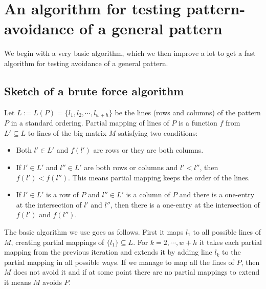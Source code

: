 \chapter{An algorithm for testing pattern-avoidance of a general pattern}
We begin with a very basic algorithm, which we then improve a lot to get a fast algorithm for testing avoidance of a general pattern.

\section{Sketch of a brute force algorithm}
Let $L:=L(P)=\{l_1,l_2,\cdots,l_{w+h}\}$ be the lines (rows and columns) of the pattern $P$ in a standard ordering. Partial mapping of lines of $P$ is a function $f$ from $L'\subseteq L$ to lines of the big matrix $M$ satisfying two conditions: 
\begin{itemize}
\item Both $l'\in L'$ and $f(l')$ are rows or they are both columns.
\item If $l'\in L'$ and $l''\in L'$ are both rows or columns and $l'<l''$, then $f(l')<f(l'')$. This means partial mapping keeps the order of the lines.
\item If $l'\in L'$ is a row of $P$ and $l''\in L'$ is a column of $P$ and there is a one-entry at the intersection of $l'$ and $l''$, then there is a one-entry at the intersection of $f(l')$ and $f(l'')$.
\end{itemize}
The basic algorithm we use goes as follows. First it maps $l_1$ to all possible lines of $M$, creating partial mappings of $\{l_1\}\subseteq L$. For $k=2,\cdots,w+h$ it takes each partial mapping from the previous iteration and extends it by adding line $l_k$ to the partial mapping in all possible ways. If we manage to map all the lines of $P$, then $M$ does not avoid it and if at some point there are no partial mappings to extend it means $M$ avoids $P$.

